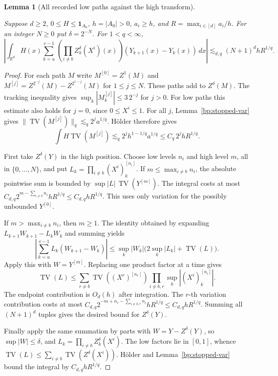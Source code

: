 \documentclass[11pt,letterpaper]{article}
\newtheorem{lemma}[theorem]{Lemma}
\theoremstyle{definition}
\newcommand{\R}{\mathbb R}
\newcommand{\ind}{\mathbf1}
\newcommand{\norm}[1]{\lVert#1\rVert}
\providecommand{\lean}[1]{}
\providecommand{\uses}[1]{}
\begin{document}
\begin{lemma}[All recorded low paths against the high transform]\label{bp:all-coarse}
\lean{TwistedParaproduct.allCoarse}
Suppose \(d\ge2\), \(0\le H\le\ind_{A_0}\), \(h=|A_0|>0\),
\(a_i\ge h\), and \(R=\max_{i\in[d]}a_i/h\). For an integer \(N\ge0\)
put \(\delta=2^{-N}\). For \(1<q<\infty\),
\[
 \left|\int_{\R^d}H(x)\sum_{k=u}^{v-1}
       \left(\prod_{i\ne b} Z^\delta_k(X^i)(x)\right)
                           (Y_{k+1}(x)-Y_k(x))\,dx\right|
          \lesssim_{d,q}(N+1)^d h R^{1/q}.
\]
\end{lemma}
\begin{proof}
\uses{bp:stopped-var}
For each path \(M\) write \(M^{[0]}=Z^1(M)\) and
\(M^{[j]}=Z^{2^{-j}}(M)-Z^{2^{1-j}}(M)\) for \(1\le j\le N\).
These paths add to \(Z^\delta(M)\). The tracking inequality gives
\(\sup_k|M_k^{[j]}|\le3\,2^{-j}\) for \(j>0\). For low paths
this estimate also holds for \(j=0\), since \(0\le X^i\le1\).
For all \(j\), Lemma~\ref{bp:stopped-var} gives
\(\norm{\operatorname{TV}(M^{[j]})}_q\lesssim_q 2^j a^{1/q}\).
H\"older therefore gives
\[
        \int H\operatorname{TV}(M^{[j]})
              \lesssim_q 2^j h^{1-1/q}a^{1/q}
              \le C_q\,2^j hR^{1/q}.
\]

First take \(Z^\delta(Y)\) in the high position. Choose low levels
\(n_i\) and high level \(m\), all in \(\{0,\ldots,N\}\), and put
\(L_k=\prod_{i\ne b}(X^i)^{[n_i]}_k\). If \(m\le\max_{i\ne b}n_i\),
the absolute pointwise sum is bounded by
\(\sup|L|\,\operatorname{TV}(Y^{[m]})\). The integral costs at most
\(C_{d,q}2^{m-\sum_{i\ne b}n_i}hR^{1/q}\le C_{d,q}hR^{1/q}\).
This uses only variation for the possibly unbounded \(Y^{[0]}\).

If \(m>\max_{i\ne b}n_i\), then \(m\ge1\). The identity obtained
by expanding \(L_{k+1}W_{k+1}-L_kW_k\) and summing yields
\[
 \left|\sum_{k=u}^{v-1}L_k(W_{k+1}-W_k)\right|
       \le \sup_k|W_k|\bigl(2\sup_k|L_k|+\operatorname{TV}(L)\bigr).
\]
Apply this with \(W=Y^{[m]}\). Replacing one product factor at a
time gives
\[
 \operatorname{TV}(L)\le
  \sum_{r\ne b}\operatorname{TV}((X^r)^{[n_r]})
                \prod_{i\ne b,r}\sup_k|(X^i)_k^{[n_i]}|.
\]
The endpoint contribution is \(O_d(h)\) after integration. The
\(r\)-th variation contribution costs at most
\(C_{d,q}2^{-m+n_r-\sum_{i\ne b,r}n_i}hR^{1/q}
\le C_{d,q}hR^{1/q}\). Summing all \((N+1)^d\) tuples gives
the desired bound for \(Z^\delta(Y)\).

Finally apply the same summation by parts with \(W=Y-Z^\delta(Y)\),
so \(\sup|W|\le\delta\), and \(L_k=\prod_{i\ne b}Z^\delta_k(X^i)\).
The low factors lie in \([0,1]\), whence
\(\operatorname{TV}(L)\le\sum_{i\ne b}\operatorname{TV}(Z^\delta(X^i))\).
H\"older and Lemma~\ref{bp:stopped-var} bound the integral by
\(C_{d,q}hR^{1/q}\).
\end{proof}
\end{document}
